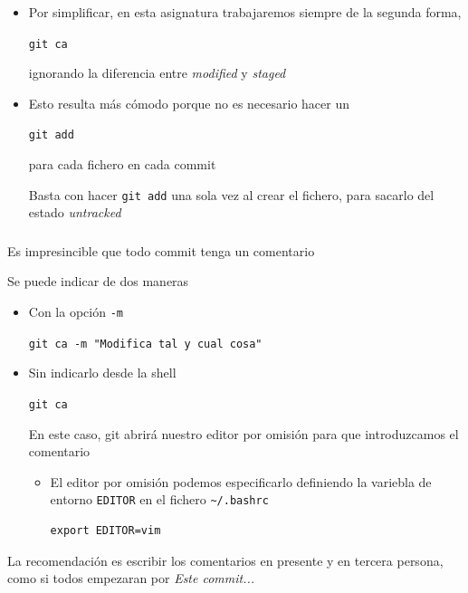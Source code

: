 \documentclass[ucs]{beamer}
\begin{document}
\begin{frame}[fragile]
\begin{itemize}
\item

Por simplificar, en esta asignatura trabajaremos siempre de la segunda forma,

\verb|git ca|

ignorando la diferencia entre \emph{modified} y \emph{staged}

\item
Esto resulta más cómodo porque 
no es necesario hacer un 

\verb|git add| 

para cada fichero en cada commit

Basta con hacer \verb|git add| una sola vez al crear el fichero, para sacarlo del
estado \emph{untracked}
\end{itemize}

\end{frame}



\begin{frame}[fragile]
\frametitle{}
Es impresincible que todo commit tenga un comentario

Se puede indicar de dos maneras
\begin{itemize}
\item
Con la opción \verb|-m|

\verb|git ca -m "Modifica tal y cual cosa"|
\item
Sin indicarlo desde la shell

\verb|git ca |

En este caso,  git abrirá nuestro editor por omisión para
que introduzcamos el comentario


\begin{itemize}
\item
El editor por omisión podemos especificarlo definiendo la
variebla de entorno \verb|EDITOR| en el fichero
\verb|~/.bashrc|

  \begin{footnotesize}
  \begin{verbatim}
export EDITOR=vim
  \end{verbatim}
  \end{footnotesize}
\end{itemize}


\end{itemize}

La recomendación es escribir los comentarios en presente y en tercera persona,
como si todos empezaran por \emph{Este commit...}
\end{frame}
\end{document}
